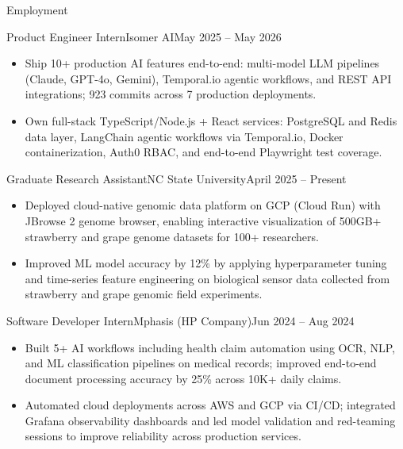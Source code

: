 \documentclass[]{mcdowellcv}
\begin{document}
\makeheader

\begin{cvsection}{Employment}
  \begin{cvsubsection}{Product Engineer Intern}{Isomer AI}{May 2025 -- May 2026}
    \begin{itemize}
      \item Ship 10+ production AI features end-to-end: multi-model LLM pipelines (Claude, GPT-4o, Gemini), Temporal.io agentic workflows, and REST API integrations; 923 commits across 7 production deployments.
      \item Own full-stack TypeScript/Node.js + React services: PostgreSQL and Redis data layer, LangChain agentic workflows via Temporal.io, Docker containerization, Auth0 RBAC, and end-to-end Playwright test coverage.
    \end{itemize}
    \vspace{-1.5pt}
  \end{cvsubsection}

  \begin{cvsubsection}{Graduate Research Assistant}{NC State University}{April 2025 -- Present}
    \begin{itemize}
      \item Deployed cloud-native genomic data platform on GCP (Cloud Run) with JBrowse 2 genome browser, enabling interactive visualization of 500GB+ strawberry and grape genome datasets for 100+ researchers.
      \item Improved ML model accuracy by 12\% by applying hyperparameter tuning and time-series feature engineering on biological sensor data collected from strawberry and grape genomic field experiments.
    \end{itemize}
    \vspace{-1.5pt}
  \end{cvsubsection}

  \begin{cvsubsection}{Software Developer Intern}{Mphasis (HP Company)}{Jun 2024 -- Aug 2024}
    \begin{itemize}
      \item Built 5+ AI workflows including health claim automation using OCR, NLP, and ML classification pipelines on medical records; improved end-to-end document processing accuracy by 25\% across 10K+ daily claims.
      \item Automated cloud deployments across AWS and GCP via CI/CD; integrated Grafana observability dashboards and led model validation and red-teaming sessions to improve reliability across production services.
    \end{itemize}
    \vspace{-1.5pt}
  \end{cvsubsection}


\end{cvsection}
\end{document}
